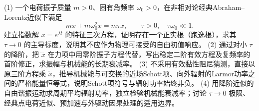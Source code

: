 (1) 一个电荷振子质量 \(m>0\)、固有角频率 \(\omega_0>0\)，在非相对论经典Abraham–Lorentz近似下满足
\[
m\ddot x+m\omega_0^2x=m\tau\dddot x,\qquad \tau>0,\quad \tau\omega_0\ll1.
\]
建立指数解 \(x=e^{\lambda t}\) 的特征三次方程，证明存在一个正实根（跑逸根），求其 \(\tau\to0\) 的主导标度，说明其不应作为物理可接受的自由初值响应。
(2) 通过对小 \(\tau\) 的降阶，把 \(\dddot x\) 在力项中用零阶振子方程代替，写出稳定二阶有效方程及复频率的首阶修正，求振幅与机械能的长期衰减率。
(3) 不采用有效黏性阻尼猜测，直接以原三阶方程乘 \(\dot x\)，推导机械能与可交换的近场Schott项、向外辐射的Larmor功率之间的严格能量恒等式，说明Schott项符号与辐射功率始终非负。
(4) 用降阶近似的自由谐振运动求周期平均辐射功率，独立检验机械能衰减率；讨论 \(\tau\to0\) 极限、经典点电荷近似、预加速与外驱动因果处理的适用边界。
